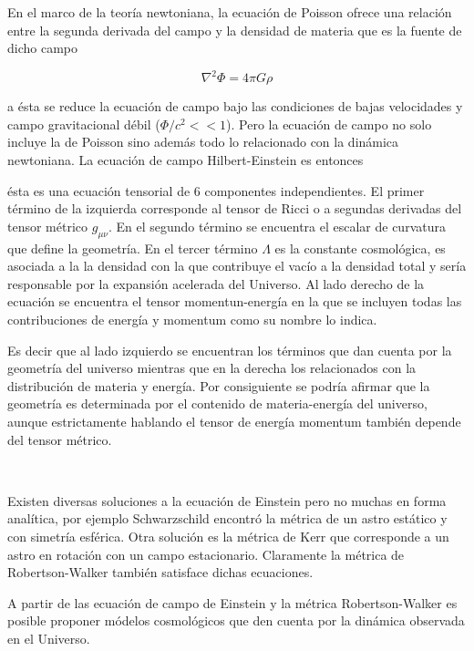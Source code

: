 \documentclass[a4,useAMS,usenatbib,usegraphicx,12pt]{article}
\begin{document}
En el marco de la teoría newtoniana, la ecuaci\'on de Poisson ofrece una 
relaci\'on entre la segunda derivada del campo y la densidad de materia 
que es la fuente de dicho campo

\[ \nabla^2\Phi=4\pi G\rho\]

a ésta se reduce la ecuación de campo bajo las condiciones de bajas velocidades 
y campo gravitacional débil ($\Phi/c^2<< 1$). 
Pero la ecuación de campo no solo incluye la de Poisson sino además todo lo 
relacionado con la dinámica newtoniana. La ecuación de campo Hilbert-Einstein es 
entonces


ésta es una ecuaci\'on tensorial de 6 componentes independientes. 
El primer t\'ermino de la izquierda corresponde al tensor de Ricci 
o a segundas derivadas del tensor m\'etrico $g_{\mu\nu}$. 
En el segundo t\'ermino se encuentra el escalar de curvatura 
que define la geometr\'ia. 
En el tercer t\'ermino $\Lambda$ es la constante cosmol\'ogica, 
es asociada a la la densidad con la que contribuye el vacío a 
la densidad total y sería responsable por la expansión acelerada del 
Universo. 
Al lado derecho de la ecuación se encuentra el tensor momentun-energ\'ia 
en la que se incluyen todas las contribuciones de energía y momentum 
como su nombre lo indica.

Es decir que al lado izquierdo se encuentran los t\'erminos que dan 
cuenta por la geometr\'ia del universo mientras que en la derecha 
los relacionados con la distribuci\'on de materia y e\-ner\-gía. 
Por consiguiente se podría afirmar que la geometr\'ia es determinada por 
el contenido de materia-energ\'ia del universo, aunque estrictamente 
hablando el tensor de energ\'ia momentum tambi\'en depende del tensor m\'etrico. 


\

Existen diversas soluciones a la ecuación de Einstein 
pero no muchas en forma analítica, por ejemplo Schwarzschild encontró 
la m\'etrica de un astro est\'atico y con simetría esférica. 
Otra soluci\'on es la m\'etrica de Kerr que corresponde a un astro en 
rotaci\'on con un campo estacionario. 
Claramente la m\'etrica de Robertson-Walker también satisface dichas ecuaciones.


A partir de las ecuación de campo de Einstein y la métrica Robertson-Walker 
es posible proponer módelos cosmológicos que den cuenta por la dinámica observada 
en el Universo. 
\end{document}
